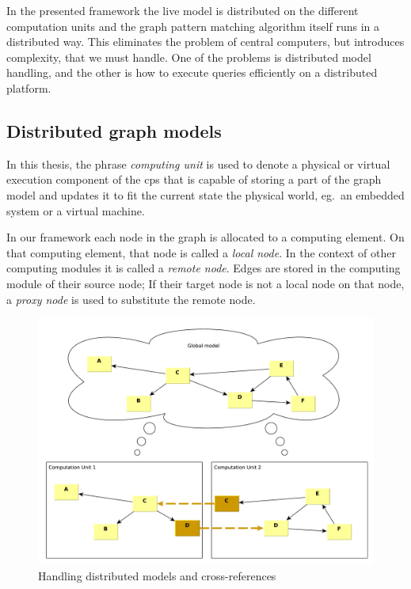 In the presented framework the live model is distributed on the different computation units and the graph pattern matching algorithm itself runs in a distributed way. 
This eliminates the problem of central computers, but introduces complexity, that we must handle.
One of the problems is distributed model handling, and the other is how to execute queries efficiently on a distributed platform.





\subsection{Distributed graph models}

In this thesis, the phrase \emph{computing unit} is used to denote a physical or virtual execution component of the cps that is capable of storing a part of the graph model and updates it to fit the current state the physical world, eg.\ an embedded system or a virtual machine.

In our framework each node in the graph is allocated to a computing element. 
On that computing element, that node is called a \emph{local node}. 
In the context of other computing modules it is called a \emph{remote node}. 
Edges are stored in the computing module of their source node; 
If their target node is not a local node on that node, a \emph{proxy node} is used to substitute the remote node.



\begin{figure}[h]
	\begin{center}
		\includegraphics[width=\textwidth]{figures/distributed-model-handling.pdf}
		\caption{Handling distributed models and cross-references}
		\label{fig:distributed-model-handling}
	\end{center}
\end{figure}



